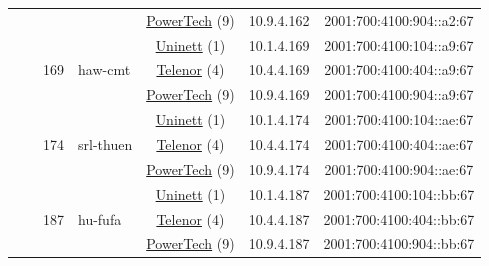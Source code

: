 \begin{small}
\begin{center}
\begin{longtable}{|c|c|c|c|c|c|c|c|}
  &  &  &  & \multicolumn{2}{|c|}{\tiny{\href{http://www.powertech.no}{PowerTech} (9)}} & \tiny{10.9.4.162} & \tiny{2001:700:4100:904::a2:67} \\* \cline{3-3}\cline{4-4}\cline{5-5}\cline{6-6}\cline{7-7}\cline{8-8}
  &  & \multirow{3}{*}{\tiny{169}} & \multicolumn{1}{|l|}{\multirow{3}{*}{\tiny{haw-cmt}}} & \multicolumn{2}{|c|}{\tiny{\href{https://www.uninett.no}{Uninett} (1)}} & \tiny{10.1.4.169} & \tiny{2001:700:4100:104::a9:67} \\* \cline{5-5}\cline{6-6}\cline{7-7}\cline{8-8}
  &  &  &  & \multicolumn{2}{|c|}{\tiny{\href{https://www.telenor.no}{Telenor} (4)}} & \tiny{10.4.4.169} & \tiny{2001:700:4100:404::a9:67} \\* \cline{5-5}\cline{6-6}\cline{7-7}\cline{8-8}
  &  &  &  & \multicolumn{2}{|c|}{\tiny{\href{http://www.powertech.no}{PowerTech} (9)}} & \tiny{10.9.4.169} & \tiny{2001:700:4100:904::a9:67} \\* \cline{3-3}\cline{4-4}\cline{5-5}\cline{6-6}\cline{7-7}\cline{8-8}
  &  & \multirow{3}{*}{\tiny{174}} & \multicolumn{1}{|l|}{\multirow{3}{*}{\tiny{srl-thuen}}} & \multicolumn{2}{|c|}{\tiny{\href{https://www.uninett.no}{Uninett} (1)}} & \tiny{10.1.4.174} & \tiny{2001:700:4100:104::ae:67} \\* \cline{5-5}\cline{6-6}\cline{7-7}\cline{8-8}
  &  &  &  & \multicolumn{2}{|c|}{\tiny{\href{https://www.telenor.no}{Telenor} (4)}} & \tiny{10.4.4.174} & \tiny{2001:700:4100:404::ae:67} \\* \cline{5-5}\cline{6-6}\cline{7-7}\cline{8-8}
  &  &  &  & \multicolumn{2}{|c|}{\tiny{\href{http://www.powertech.no}{PowerTech} (9)}} & \tiny{10.9.4.174} & \tiny{2001:700:4100:904::ae:67} \\* \cline{3-3}\cline{4-4}\cline{5-5}\cline{6-6}\cline{7-7}\cline{8-8}
  &  & \multirow{3}{*}{\tiny{187}} & \multicolumn{1}{|l|}{\multirow{3}{*}{\tiny{hu-fufa}}} & \multicolumn{2}{|c|}{\tiny{\href{https://www.uninett.no}{Uninett} (1)}} & \tiny{10.1.4.187} & \tiny{2001:700:4100:104::bb:67} \\* \cline{5-5}\cline{6-6}\cline{7-7}\cline{8-8}
  &  &  &  & \multicolumn{2}{|c|}{\tiny{\href{https://www.telenor.no}{Telenor} (4)}} & \tiny{10.4.4.187} & \tiny{2001:700:4100:404::bb:67} \\* \cline{5-5}\cline{6-6}\cline{7-7}\cline{8-8}
  &  &  &  & \multicolumn{2}{|c|}{\tiny{\href{http://www.powertech.no}{PowerTech} (9)}} & \tiny{10.9.4.187} & \tiny{2001:700:4100:904::bb:67} \\* \cline{3-3}\cline{4-4}\cline{5-5}\cline{6-6}\cline{7-7}\cline{8-8}

\end{longtable}
\end{center}
\end{small}
